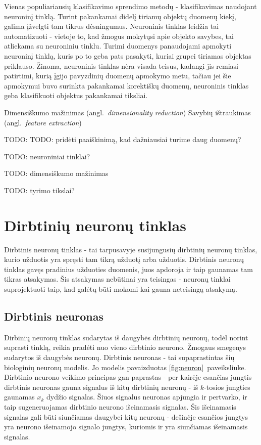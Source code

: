 \documentclass{VUMIFPSbakalaurinis}
\newcommand{\TODO}[1]{
\colorbox{todo-background-color}{TODO: #1}
}
\begin{document}
Vienas populiariausių klasifikavimo sprendimo metodų - klasifikavimas naudojant neuroninį tinklą.
Turint pakankamai didelį tiriamų objektų duomenų kiekį, galima įžvelgti tam tikrus dėsningumus.
Neuroninis tinklas leidžia tai automatizuoti - vietoje to, kad žmogus mokytųsi apie objekto savybes, tai atliekama su neuroniniu tinklu.
Turimi duomenys panaudojami apmokyti neuroninį tinklą, kuris po to geba pats pasakyti, kuriai grupei tiriamas objektas priklauso.
Žinoma, neuroninis tinklas nėra visada teisus, kadangi jis remiasi patirtimi, kurią įgijo pavyzdinių duomenų apmokymo metu, tačiau jei šie apmokymui buvo surinkta pakankamai korektiškų duomenų, neuroninis tinklas geba klasifikuoti objektus pakankamai tiksliai.

Dimensiškumo mažinimas (angl.~\textit{dimensionality reduction})
Savybių ištraukimas (angl.~\textit{feature extraction})

\TODO{TODO: pridėti paaiškinimą, kad dažniausiai turime daug duomenų?}

\TODO{neuroniniai tinklai?}
\TODO{dimensiškumo mažinimas}
\TODO{tyrimo tikslai?}

\section{Dirbtinių neuronų tinklas}

Dirbtinis neuronų tinklas - tai tarpusavyje susijungusių dirbtinių neuronų tinklas, kurio užduotis yra spręsti tam tikrą užduotį arba užduotis.
Dirbtinis neuronų tinklas gavęs pradinius užduoties duomenis, juos apdoroja ir taip gaunamas tam tikras atsakymas.
Šis atsakymas nebūtinai yra teisingas - neuronų tinklai suprojektuoti taip, kad galėtų būti mokomi kai gauna neteisingą atsakymą.

\subsection{Dirbtinis neuronas}

Dirbinių neuronų tinklas sudarytas iš daugybės dirbtinių neuronų, todėl norint suprasti tinklą, reikia pradėti nuo vieno dirbtinio neurono.
Žmogaus smegenys sudarytos iš daugybės neuronų.
Dirbtinis neuronas - tai supaprastintas šių biologinių neuronų modelis.
Jo modelis pavaizduotas \ref{fig:neuron}~paveiksliuke.
Dirbtinio neurono veikimo principas gan paprastas - per kairėje esančias jungtis dirbtinis neuronas gauna signalus iš kitų dirbtinių neuronų - iš $k$-tosios jungties gaunamas $x_k$ dydžio signalas.
Šiuos signalus neuronas apjungia ir pertvarko, ir taip sugeneruojamas dirbtinio neurono išeinamasis signalas.
Šis išeinamasis signalas gali būti siunčiamas daugybei kitų neuronų - dešinėje esančios jungtys yra neurono išeinamojo signalo jungtys, kuriomis ir yra siunčiamas išeinamasis signalas.
\end{document}

